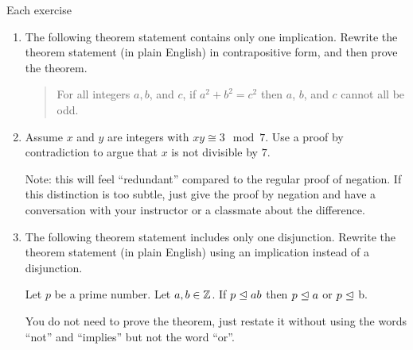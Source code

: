  \begin{xca}
 	
 	Each exercise
 \begin{enumerate}
 	\item 	 The following theorem statement contains only one implication.  Rewrite the theorem statement (in plain English) in contrapositive form, and then prove the theorem.
 	
 	\begin{quote}
 		For all integers $a,b$, and $c$, if $a^2+b^2 = c^2$ then $a$, $b$, and $c$ cannot all be odd.
 	\end{quote}
 
\item Assume $x$ and $y$ are integers with $xy \cong 3 \mod 7$.  Use a proof by contradiction to argue that $x$ is not divisible by $7$.

Note:  this will feel ``redundant'' compared to the regular proof of negation.  If this distinction is too subtle, just give the proof by negation and have a conversation with your instructor or a classmate about the difference.

\item The following theorem statement includes only one disjunction.  Rewrite the theorem statement (in plain English) using an implication instead of a disjunction.

\begin{theorem}
	Let $p$ be a prime number.  Let $a,b \in \mathbb{Z}$.  If $p \trianglelefteq ab$ then $p \trianglelefteq a$ or $p \trianglelefteq$ b.
	\end{theorem}

You do not need to prove the theorem, just restate it without using the words ``not'' and ``implies'' but not the word ``or''.

 	\end{enumerate}
 	\end{xca}